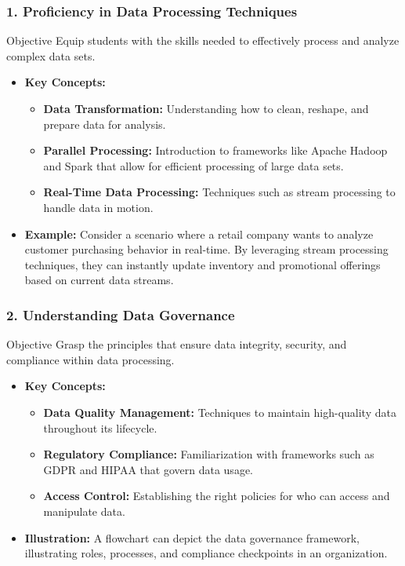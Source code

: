 \documentclass[aspectratio=169]{beamer}
\begin{document}
\begin{frame}[fragile]
    \frametitle{1. Proficiency in Data Processing Techniques}
    \begin{block}{Objective}
        Equip students with the skills needed to effectively process and analyze complex data sets.
    \end{block}
    \begin{itemize}
        \item \textbf{Key Concepts:}
        \begin{itemize}
            \item \textbf{Data Transformation:} Understanding how to clean, reshape, and prepare data for analysis.
            \item \textbf{Parallel Processing:} Introduction to frameworks like Apache Hadoop and Spark that allow for efficient processing of large data sets.
            \item \textbf{Real-Time Data Processing:} Techniques such as stream processing to handle data in motion.
        \end{itemize}
        
        \item \textbf{Example:} 
        Consider a scenario where a retail company wants to analyze customer purchasing behavior in real-time. By leveraging stream processing techniques, they can instantly update inventory and promotional offerings based on current data streams.
    \end{itemize}
\end{frame}

\begin{frame}[fragile]
    \frametitle{2. Understanding Data Governance}
    \begin{block}{Objective}
        Grasp the principles that ensure data integrity, security, and compliance within data processing.
    \end{block}
    \begin{itemize}
        \item \textbf{Key Concepts:}
        \begin{itemize}
            \item \textbf{Data Quality Management:} Techniques to maintain high-quality data throughout its lifecycle.
            \item \textbf{Regulatory Compliance:} Familiarization with frameworks such as GDPR and HIPAA that govern data usage.
            \item \textbf{Access Control:} Establishing the right policies for who can access and manipulate data.
        \end{itemize}

        \item \textbf{Illustration:}
        A flowchart can depict the data governance framework, illustrating roles, processes, and compliance checkpoints in an organization.
    \end{itemize}
\end{frame}
\end{document}
